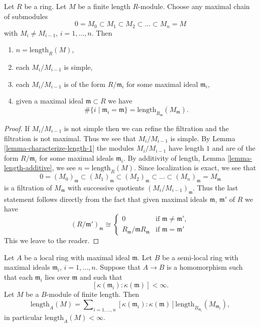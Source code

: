 \begin{lemma}
\label{lemma-simple-pieces}
Let $R$ be a ring. Let $M$ be a finite length $R$-module.
Choose any maximal chain of submodules
$$
0 = M_0 \subset M_1 \subset M_2 \subset \ldots \subset M_n = M
$$
with $M_i \not = M_{i-1}$, $i = 1, \ldots, n$. Then
\begin{enumerate}
\item $n = \text{length}_R(M)$,
\item each $M_i/M_{i-1}$ is simple,
\item each $M_i/M_{i-1}$ is of the form
$R/\mathfrak m_i$ for some maximal ideal $\mathfrak m_i$,
\item given a maximal ideal $\mathfrak m \subset R$
we have
$$
\# \{i \mid \mathfrak m_i = \mathfrak m\}
=
\text{length}_{R_{\mathfrak m}} (M_{\mathfrak m}).
$$
\end{enumerate}
\end{lemma}

\begin{proof}
If $M_i/M_{i-1}$ is not simple then we can refine the filtration
and the filtration is not maximal. Thus we see that $M_i/M_{i-1}$
is simple. By Lemma \ref{lemma-characterize-length-1} the modules
$M_i/M_{i-1}$ have length $1$ and are of the form $R/\mathfrak m_i$
for some maximal ideals $\mathfrak m_i$. By additivity of length,
Lemma \ref{lemma-length-additive}, we see $n = \text{length}_R(M)$.
Since localization is exact, we see that
$$
0 = (M_0)_{\mathfrak m}
\subset (M_1)_{\mathfrak m}
\subset (M_2)_{\mathfrak m}
\subset \ldots
\subset (M_n)_{\mathfrak m} = M_{\mathfrak m}
$$
is a filtration of $M_{\mathfrak m}$ with successive quotients
$(M_i/M_{i-1})_{\mathfrak m}$. Thus the last statement follows
directly from the fact that given maximal ideals $\mathfrak m$,
$\mathfrak m'$ of $R$ we have
$$
(R/\mathfrak m')_{\mathfrak m}
\cong
\left\{
\begin{matrix}
0 &
\text{if } \mathfrak m \not = \mathfrak m', \\
R_{\mathfrak m}/\mathfrak m R_{\mathfrak m} &
\text{if } \mathfrak m  = \mathfrak m'
\end{matrix}
\right.
$$
This we leave to the reader.
\end{proof}

\begin{lemma}
\label{lemma-pushdown-module}
Let $A$ be a local ring with maximal ideal $\mathfrak m$.
Let $B$ be a semi-local ring with maximal ideals $\mathfrak m_i$,
$i = 1, \ldots, n$.
Suppose that $A \to B$ is a homomorphism such that each $\mathfrak m_i$
lies over $\mathfrak m$ and such that
$$
[\kappa(\mathfrak m_i) : \kappa(\mathfrak m)] < \infty.
$$
Let $M$ be a $B$-module of finite length.
Then
$$
\text{length}_A(M) = \sum\nolimits_{i = 1, \ldots, n}
[\kappa(\mathfrak m_i) : \kappa(\mathfrak m)]
\text{length}_{B_{\mathfrak m_i}}(M_{\mathfrak m_i}),
$$
in particular $\text{length}_A(M) < \infty$.
\end{lemma}

